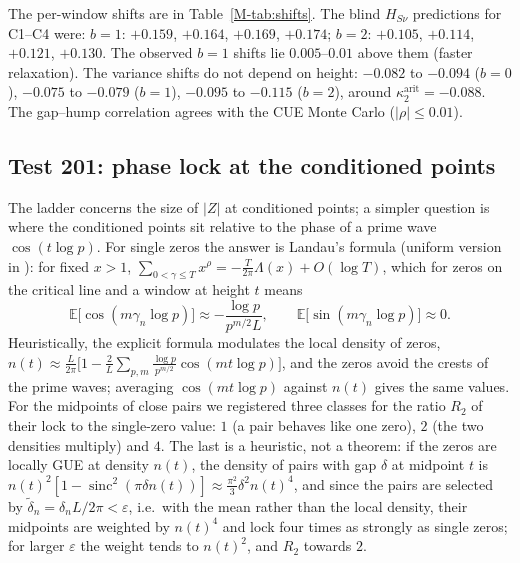 \documentclass[12pt]{amsart}
\theoremstyle{remark}
\newcommand{\E}{\mathbb{E}}
\newcommand{\eps}{\varepsilon}
\newcommand{\1}{\mathbf{1}}
\newcommand{\sinc}{\operatorname{sinc}}
\begin{document}
The per-window shifts are in Table~\ref{M-tab:shifts}. The blind
$H_{S\nu}$ predictions for C1--C4 were: $b=1$: $+0.159$, $+0.164$,
$+0.169$, $+0.174$; $b=2$: $+0.105$, $+0.114$, $+0.121$, $+0.130$. The
observed $b=1$ shifts lie $0.005$--$0.01$ above them (faster relaxation).
The variance shifts do not depend on height: $-0.082$ to $-0.094$ ($b=0$),
$-0.075$ to $-0.079$ ($b=1$), $-0.095$ to $-0.115$ ($b=2$), around
$\kappa_2^{\mathrm{arit}}=-0.088$. The gap--hump correlation agrees with
the CUE Monte Carlo ($|\rho|\le0.01$).

\subsection*{Test 201: phase lock at the conditioned points}
The ladder concerns the size of $|Z|$ at conditioned points; a simpler
question is where the conditioned points sit relative to the phase of a
prime wave $\cos(t\log p)$. For single zeros the answer is Landau's formula
\cite{Landau12} (uniform version in \cite{Gonek93}): for fixed $x>1$,
$\sum_{0<\gamma\le T}x^{\rho}=-\frac T{2\pi}\Lambda(x)+O(\log T)$, which for
zeros on the critical line and a window at height $t$ means
\[
\E\big[\cos(m\gamma_n\log p)\big]\approx-\frac{\log p}{p^{m/2}L},\qquad
\E\big[\sin(m\gamma_n\log p)\big]\approx0 .
\]
Heuristically, the explicit formula modulates the local density of zeros,
$n(t)\approx\frac L{2\pi}\big[1-\frac2L\sum_{p,m}\frac{\log p}{p^{m/2}}
\cos(mt\log p)\big]$, and the zeros avoid the crests of the prime waves;
averaging $\cos(mt\log p)$ against $n(t)$ gives the same values. For the
midpoints of close pairs we registered three classes for the ratio $R_2$
of their lock to the single-zero value: $1$ (a pair behaves like one
zero), $2$ (the two densities multiply) and $4$. The last is a heuristic,
not a theorem: if the zeros are locally GUE at density $n(t)$, the density
of pairs with gap $\delta$ at midpoint $t$ is
$n(t)^2[1-\sinc^2(\pi\delta n(t))]\approx\frac{\pi^2}3\delta^2n(t)^4$, and
since the pairs are selected by $\tilde\delta_n=\delta_nL/2\pi<\eps$, i.e.\
with the mean rather than the local density, their midpoints are weighted
by $n(t)^4$ and lock four times as strongly as single zeros; for larger
$\eps$ the weight tends to $n(t)^2$, and $R_2$ towards $2$.
\end{document}
